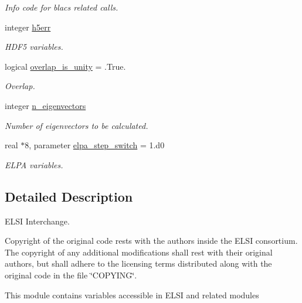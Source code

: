 \begin{DoxyCompactItemize}
\begin{DoxyCompactList}\small\item\em Info code for blacs related calls. \end{DoxyCompactList}\item 
integer \hyperlink{namespacedimensions_a243ee55b5b7e8f7c8bfd83e901331bc3}{h5err}
\begin{DoxyCompactList}\small\item\em H\+D\+F5 variables. \end{DoxyCompactList}\item 
logical \hyperlink{namespacedimensions_a93911be2b2a6f6b0dda974846dbf5973}{overlap\+\_\+is\+\_\+unity} = .True.
\begin{DoxyCompactList}\small\item\em Overlap. \end{DoxyCompactList}\item 
\hypertarget{namespacedimensions_a562e57aedd7f066db766547b3b41cd6c}{}integer \hyperlink{namespacedimensions_a562e57aedd7f066db766547b3b41cd6c}{n\+\_\+eigenvectors}\label{namespacedimensions_a562e57aedd7f066db766547b3b41cd6c}

\begin{DoxyCompactList}\small\item\em Number of eigenvectors to be calculated. \end{DoxyCompactList}\item 
real $\ast$8, parameter \hyperlink{namespacedimensions_a9ba7a66f9ea734e4a601d9a958e97410}{elpa\+\_\+step\+\_\+switch} = 1.d0
\begin{DoxyCompactList}\small\item\em E\+L\+P\+A variables. \end{DoxyCompactList}\end{DoxyCompactItemize}


\subsection{Detailed Description}
E\+L\+S\+I Interchange. 

Copyright of the original code rests with the authors inside the E\+L\+S\+I consortium. The copyright of any additional modifications shall rest with their original authors, but shall adhere to the licensing terms distributed along with the original code in the file \char`\"{}\+C\+O\+P\+Y\+I\+N\+G\char`\"{}.

This module contains variables accessible in E\+L\+S\+I and related modules 

